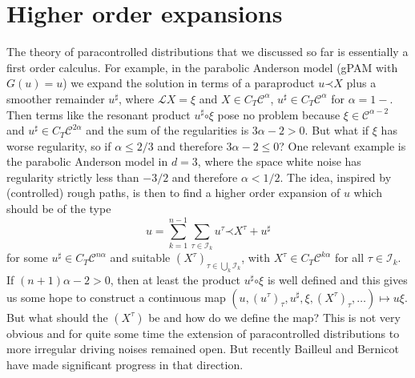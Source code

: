 \documentclass[a4paper, 11pt]{article}
\newcommand{\para}{\mathord{\prec}}
\newcommand{\reso}{\mathord{\circ}}
\begin{document}
\section{Higher order expansions}\label{sec:higherorder}

The theory of paracontrolled distributions that we discussed so far is
essentially a first order calculus. For example, in the parabolic Anderson
model (gPAM with $G (u) = u$) we expand the solution in terms of a paraproduct
$u \para X$ plus a smoother remainder $u^{\sharp}$, where $\mathcal{L}X = \xi$
and $X \in C_T \mathcal{C}^{\alpha}$, $u^{\sharp} \in C_T \mathcal{C}^{\alpha}$ for $\alpha = 1-$. Then terms like the resonant product $u^{\sharp} \reso
\xi$ pose no problem because $\xi \in \mathcal{C}^{\alpha - 2}$ and
$u^{\sharp} \in C_T \mathcal{C}^{2 \alpha}$ and the sum of the regularities is $3 \alpha
- 2 > 0$. But what if $\xi$ has worse regularity, so if $\alpha \leqslant 2 / 3$ and therefore $3\alpha - 2 \leqslant 0$? One relevant example is the parabolic Anderson
model in $d = 3$, where the space white noise has regularity strictly less
than $- 3 / 2$ and therefore $\alpha < 1 / 2$. The idea, inspired by (controlled) rough paths, is then to find a higher order expansion of $u$ which
should be of the type
\[ u = \sum_{k = 1}^{n - 1} \sum_{\tau \in \mathcal{I}_k} u^{\tau} \para
   X^{\tau} + u^{\sharp} \]
for some $u^{\sharp} \in C_T\mathcal{C}^{n \alpha}$ and suitable
$(X^{\tau})_{\tau \in \bigcup_k \mathcal{I}_k}$, with $X^{\tau} \in C_T
\mathcal{C}^{k \alpha}$ for all $\tau \in \mathcal{I}_k$. If $(n + 1) \alpha -
2 > 0$, then at least the product $u^{\sharp} \reso \xi$ is well defined and
this gives us some hope to construct a continuous map $(u, (u^\tau)_{\tau}, u^{\sharp}, \xi, (X^\tau)_{\tau}, \dots) \mapsto u \xi$.
But what should the $(X^\tau)$ be and how do we define the map? This is not very
obvious and for quite some time the extension of paracontrolled distributions
to more irregular driving noises remained open. But recently Bailleul and
Bernicot~\cite{bailleul_higher_2016} have made significant progress in that
direction.
\end{document}
